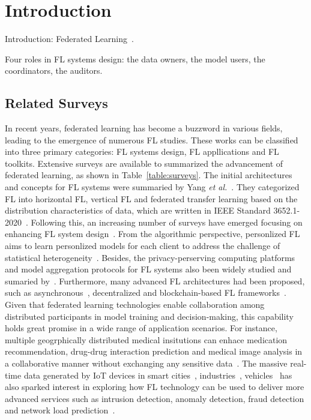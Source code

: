 \section{Introduction}
Introduction:
Federated Learning~\cite{li2020federated}.

Four roles in FL systems design: the data owners, the model users, the coordinators, the auditors.

\subsection{Related Surveys}
In recent years, federated learning has become a buzzword in various fields, leading to the emergence of numerous FL studies.
These works can be classified into three primary categories: FL systems design, FL appllications and FL toolkits. Extensive surveys are available to summarized the advancement of federated learning, as shown in Table~\ref{table:surveys}.
The initial architectures and concepts for FL systems were summaried by Yang \textit{et al.}~\cite{yang2019federated}. 
They categorized FL into horizontal FL, vertical FL and federated transfer learning based on the distribution characteristics of data, 
which are written in IEEE Standard 3652.1-2020~\cite{yang2021white, IEEEstd3652}. 
Following this, an increasing number of surveys have emerged focusing on enhancing FL system design~\cite{li2020federated,aledhari2020federated, kairouz2021advances, zhang2021survey, li2021survey}. 
From the algorithmic perspective, personlized FL~\cite{kulkarni2020survey, tan2022towards} aims to learn personlized models for each client to address the challenge of statistical heterogeneity~\cite{ma2022state}.
Besides, the privacy-perserving computing platforms and model aggregation protocols for FL systems also been widely studied and sumaried by~\cite{liu2022privacy,el2022differential,yin2021comprehensive,lyu2020threats}.
Furthermore, many advanced FL architectures had been proposed, such as asynchronous~\cite{xu2021asynchronous}, decentralized and blockchain-based FL frameworks~\cite{nguyen2021federated, qu2022blockchain, zhu2022blockchain}.
Given that federated learning technologies enable collaboration among distributed participants in model training and decision-making, this capability holds great promise in a wide range of application scenarios.
For instance, multiple geogrphically distributed medical insitutions can enhace medication recommendation, drug-drug interaction prediction and medical image analysis in a collaborative manner without exchanging any sensitive data~\cite{xu2021federated, pfitzner2021federated, antunes2022federated, rieke2020future}. 
The massive real-time data generated by IoT devices in smart cities~\cite{zhang2022federated, ramu2022federated}, industries~\cite{boopalan2022fusion}, vehicles~\cite{du2020federated} has also sparked interest in exploring how FL technology can be used to deliver more advanced services such as intrusion detection, anomaly detection, fraud detection and network load prediction~\cite{agrawal2022federated, alazab2021federated, ghimire2022recent}.

